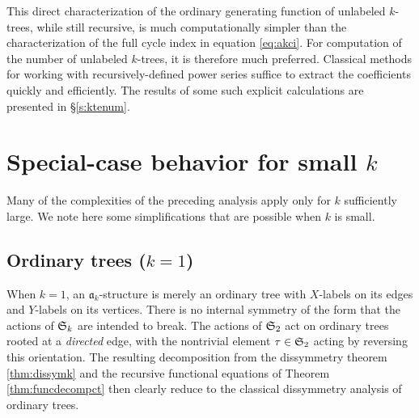 \documentclass[sectionflow,singlespace,twoside,boldmathhdr,draft]{brandiss} %
\numberwithin{section}{chapter}
\numberwithin{figure}{chapter}
\begin{document}
This direct characterization of the ordinary generating function of unlabeled $k$-trees, while still recursive, is much computationally simpler than the characterization of the full cycle index in equation \eqref{eq:akci}.
For computation of the number of unlabeled $k$-trees, it is therefore much preferred.
Classical methods for working with recursively-defined power series suffice to extract the coefficients quickly and efficiently.
The results of some such explicit calculations are presented in \S \ref{s:ktenum}.

\section{Special-case behavior for small $k$}
Many of the complexities of the preceding analysis apply only for $k$ sufficiently large.
We note here some simplifications that are possible when $k$ is small.

\subsection{Ordinary trees ($k = 1$)}
When $k = 1$, an $\mathfrak{a}_{k}$-structure is merely an ordinary tree with $X$-labels on its edges and $Y$-labels on its vertices.
There is no internal symmetry of the form that the actions of $ \mathfrak{S}_{k} $ are intended to break.
The actions of $ \mathfrak{S}_{2} $ act on ordinary trees rooted at a \emph{directed} edge, with the nontrivial element $\tau \in  \mathfrak{S}_{2} $ acting by reversing this orientation.
The resulting decomposition from the dissymmetry theorem \ref{thm:dissymk} and the recursive functional equations of Theorem \ref{thm:funcdecompct} then clearly reduce to the classical dissymmetry analysis of ordinary trees.
\end{document}
